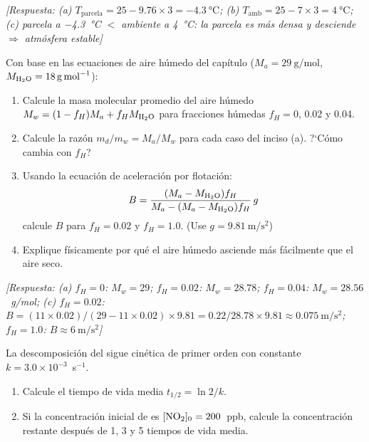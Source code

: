 \begin{bloque_ejercicios}
\begin{ejercicios}
\textit{[Respuesta:
(a) $T_{\text{parcela}} = 25 - 9.76\times3 = \SI{-4.3}{\celsius}$;
(b) $T_{\text{amb}} = 25 - 7\times3 = \SI{4}{\celsius}$;
(c) parcela a \SI{-4.3}{\celsius} $<$ ambiente a \SI{4}{\celsius}:
    la parcela es m\'as densa y desciende $\Rightarrow$ atm\'osfera
    estable]}

\item Con base en las ecuaciones de aire h\'umedo del cap\'itulo
($M_a = \SI{29}{\gram\per\mole}$, $M_{\ce{H2O}} = \SI{18}{\gram\per\mole}$):

\begin{enumerate}[label=\alph*)]
    \item Calcule la masa molecular promedio del aire h\'umedo
          $M_w = (1-f_H)M_a + f_H M_{\ce{H2O}}$ para fracciones
          h\'umedas $f_H = 0$, 0.02 y 0.04.
    \item Calcule la raz\'on $m_d/m_w = M_a/M_w$ para cada
          caso del inciso (a). ?`C\'omo cambia con $f_H$?
    \item Usando la ecuaci\'on de aceleraci\'on por flotaci\'on:
          \[
              B = \frac{(M_a - M_{\ce{H2O}})f_H}
                       {M_a - (M_a-M_{\ce{H2O}})f_H}\,g
          \]
          calcule $B$ para $f_H = 0.02$ y $f_H = 1.0$.
          (Use $g = \SI{9.81}{\metre\per\square\second}$)
    \item Explique f\'isicamente por qu\'e el aire h\'umedo
          asciende m\'as f\'acilmente que el aire seco.
\end{enumerate}

\textit{[Respuesta:
(a) $f_H=0$: $M_w=29$; $f_H=0.02$: $M_w=28.78$;
    $f_H=0.04$: $M_w=28.56$~g/mol;
(c) $f_H=0.02$: $B = (11\times0.02)/(29-11\times0.02)
    \times9.81 = 0.22/28.78\times9.81
    \approx \SI{0.075}{\metre\per\square\second}$;
    $f_H=1.0$: $B \approx \SI{6}{\metre\per\square\second}$]}

\item La descomposici\'on del  sigue cin\'etica de primer orden
con constante $k = 3.0\times10^{-3}$~s$^{-1}$.

\begin{enumerate}[label=\alph*)]
    \item Calcule el tiempo de vida media $t_{1/2} = \ln2/k$.

    \item Si la concentraci\'on inicial de  es
          $[\ce{NO2}]_0 = 200$~ppb, calcule la concentraci\'on
          restante despu\'es de 1, 3 y 5 tiempos de vida media.


\end{enumerate}
\end{ejercicios}
\end{bloque_ejercicios}

